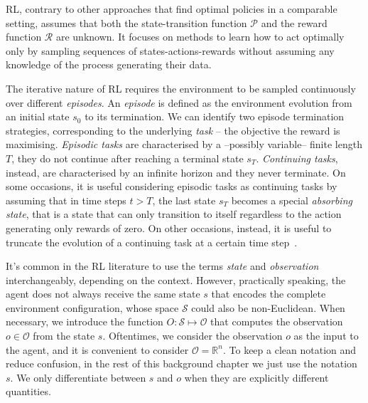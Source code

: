 \acl{RL}, contrary to other approaches that find optimal policies in a comparable setting, assumes that both the state-transition function $\mathcal{P}$ and the reward function $\mathcal{R}$ are unknown.
It focuses on methods to learn how to act optimally only by sampling sequences of states-actions-rewards without assuming any knowledge of the process generating their data.

\begin{remark*}
%
The iterative nature of \ac{RL} requires the environment to be sampled continuously over different \emph{episodes}.
An \emph{episode} is defined as the environment evolution from an initial state $s_0$ to its termination.
We can identify two episode termination strategies, corresponding to the underlying \emph{task} -- the objective the reward is maximising.
\emph{Episodic tasks} are characterised by a --possibly variable-- finite length $T$, \ie they do not continue after reaching a terminal state $s_T$.
\emph{Continuing tasks}, instead, are characterised by an infinite horizon and they never terminate.
On some occasions, it is useful considering episodic tasks as continuing tasks by assuming that in time steps $t > T$, the last state $s_T$ becomes a special \emph{absorbing state}, that is a state that can only transition to itself regardless to the action generating only rewards of zero.
On other occasions, instead, it is useful to truncate the evolution of a continuing task at a certain time step~\parencite{pardo_time_2022}.
%
\end{remark*}

\begin{remark*}
%
It's common in the \ac{RL} literature to use the terms \emph{state} and \emph{observation} interchangeably, depending on the context.
However, practically speaking, the agent does not always receive the same state $s$ that encodes the complete environment configuration, whose space $\mathcal{S}$ could also be non-Euclidean.
When necessary, we introduce the function $O: \mathcal{S} \mapsto \mathcal{O}$ that computes the observation $o \in \mathcal{O}$ from the state $s$.
Oftentimes, we consider the observation $o$ as the input to the agent, and it is convenient to consider $\mathcal{O} = \mathbb{R}^n$.
To keep a clean notation and reduce confusion, in the rest of this background chapter we just use the notation $s$.
We only differentiate between $s$ and $o$ when they are explicitly different quantities.
%
\end{remark*}

